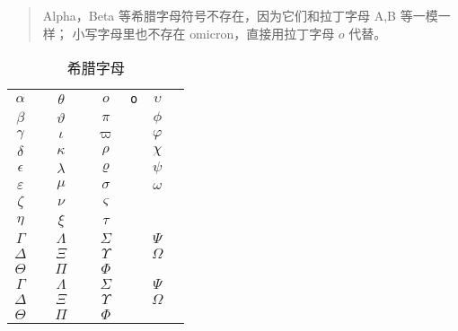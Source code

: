 \documentclass{article}
\makeatletter
\def\SYM     #1{$#1$     & \texttt{\string#1}}
\def\AMSM    #1{$#1$     & \textcolor{blue}{\texttt{\string#1}}}
\newenvironment{symbols}[1]%
  {\small\def\arraystretch{1.5
  }
  \begin{tabular}{@{}#1@{}}}%
  {\end{tabular}}
\makeatother
\begin{document}
\begin{table}[htp]
\centering
\caption{希腊字母} \label{tbl:math-greek}
\begin{quote}\footnotesize%
{Alpha}，{Beta} 等希腊字母符号不存在，因为它们和拉丁字母 A,B 等一模一样；
小写字母里也不存在 {omicron}，直接用拉丁字母 $o$ 代替。
\end{quote}
\begin{symbols}{*4{cl}}
\hline
 \SYM{\alpha}     & \SYM{\theta}     & \SYM{o}          & \SYM{\upsilon}  \\
 \SYM{\beta}      & \SYM{\vartheta}  & \SYM{\pi}        & \SYM{\phi}      \\
 \SYM{\gamma}     & \SYM{\iota}      & \SYM{\varpi}     & \SYM{\varphi}   \\
 \SYM{\delta}     & \SYM{\kappa}     & \SYM{\rho}       & \SYM{\chi}      \\
 \SYM{\epsilon}   & \SYM{\lambda}    & \SYM{\varrho}    & \SYM{\psi}      \\
 \SYM{\varepsilon}& \SYM{\mu}        & \SYM{\sigma}     & \SYM{\omega}    \\
 \SYM{\zeta}      & \SYM{\nu}        & \SYM{\varsigma}  &                 \\
 \SYM{\eta}       & \SYM{\xi}        & \SYM{\tau}       &                 \\[1ex]
 \SYM{\Gamma}     & \SYM{\Lambda}    & \SYM{\Sigma}     & \SYM{\Psi}      \\
 \SYM{\Delta}     & \SYM{\Xi}        & \SYM{\Upsilon}   & \SYM{\Omega}    \\
 \SYM{\Theta}     & \SYM{\Pi}        & \SYM{\Phi}       &                 \\[1ex]
 \AMSM{\varGamma} & \AMSM{\varLambda}& \AMSM{\varSigma}  & \AMSM{\varPsi}      \\
 \AMSM{\varDelta} & \AMSM{\varXi}    & \AMSM{\varUpsilon}& \AMSM{\varOmega}    \\
 \AMSM{\varTheta} & \AMSM{\varPi}    & \AMSM{\varPhi}    &                 \\
\hline
\end{symbols}
\end{table}
\end{document}
